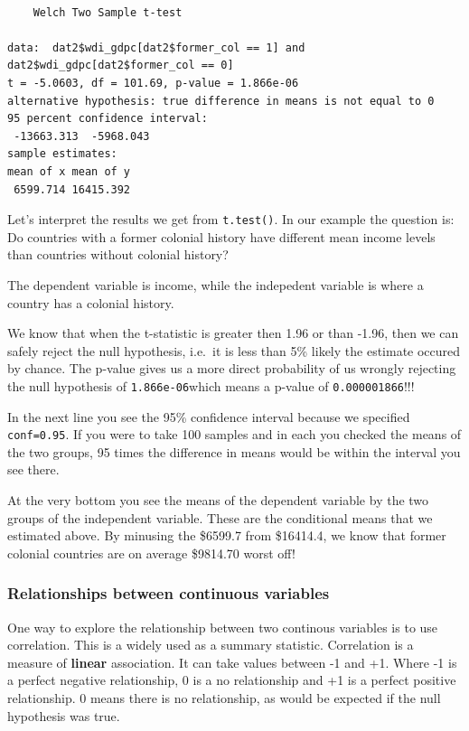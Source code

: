 \documentclass[]{article}
\begin{document}
\begin{verbatim}

    Welch Two Sample t-test

data:  dat2$wdi_gdpc[dat2$former_col == 1] and dat2$wdi_gdpc[dat2$former_col == 0]
t = -5.0603, df = 101.69, p-value = 1.866e-06
alternative hypothesis: true difference in means is not equal to 0
95 percent confidence interval:
 -13663.313  -5968.043
sample estimates:
mean of x mean of y 
 6599.714 16415.392 
\end{verbatim}

Let's interpret the results we get from \texttt{t.test()}. In our example the question is: Do countries with a former colonial history have different mean income levels than countries without colonial history?

The dependent variable is income, while the indepedent variable is where a country has a colonial history.

We know that when the t-statistic is greater then 1.96 or than -1.96, then we can safely reject the null hypothesis, i.e.~it is less than 5\% likely the estimate occured by chance. The p-value gives us a more direct probability of us wrongly rejecting the null hypothesis of \texttt{1.866e-06}which means a p-value of \texttt{0.000001866}!!!

In the next line you see the 95\% confidence interval because we specified \texttt{conf=0.95}. If you were to take 100 samples and in each you checked the means of the two groups, 95 times the difference in means would be within the interval you see there.

At the very bottom you see the means of the dependent variable by the two groups of the independent variable. These are the conditional means that we estimated above. By minusing the \$6599.7 from \$16414.4, we know that former colonial countries are on average \$9814.70 worst off!

\hypertarget{relationships-between-continuous-variables}{%
\subsubsection{Relationships between continuous variables}\label{relationships-between-continuous-variables}}

One way to explore the relationship between two continous variables is to use correlation. This is a widely used as a summary statistic. Correlation is a measure of \textbf{linear} association. It can take values between -1 and +1. Where -1 is a perfect negative relationship, 0 is a no relationship and +1 is a perfect positive relationship. 0 means there is no relationship, as would be expected if the null hypothesis was true.
\end{document}
